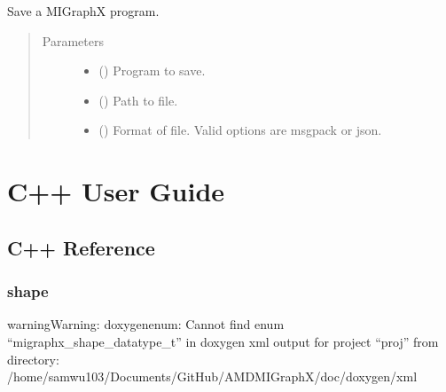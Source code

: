 \documentclass[letterpaper,10pt,english]{sphinxmanual}
\begin{document}
\begin{fulllineitems}
\label{\detokenize{reference/py:migraphx.save}}
\sphinxAtStartPar
Save a MIGraphX program.
\begin{quote}\begin{description}
\item[{Parameters}] \leavevmode\begin{itemize}
\item {} 
\sphinxAtStartPar
{} ({\hyperref[\detokenize{reference/py:migraphx.program}]{}}) \textendash{} Program to save.

\item {} 
\sphinxAtStartPar
{} () \textendash{} Path to file.

\item {} 
\sphinxAtStartPar
{} () \textendash{} Format of file. Valid options are msgpack or json.

\end{itemize}

\end{description}\end{quote}

\end{fulllineitems}



\chapter{C++ User Guide}
\label{\detokenize{cpp_user_guide:c-user-guide}}\label{\detokenize{cpp_user_guide::doc}}

\section{C++ Reference}
\label{\detokenize{reference/cpp:c-reference}}\label{\detokenize{reference/cpp::doc}}

\subsection{shape}
\label{\detokenize{reference/cpp:shape}}
\begin{sphinxadmonition}{warning}{Warning:}
\sphinxAtStartPar
doxygenenum: Cannot find enum “migraphx\_shape\_datatype\_t” in doxygen xml output for project “proj” from directory: /home/samwu103/Documents/GitHub/AMDMIGraphX/doc/doxygen/xml
\end{sphinxadmonition}
\end{document}
